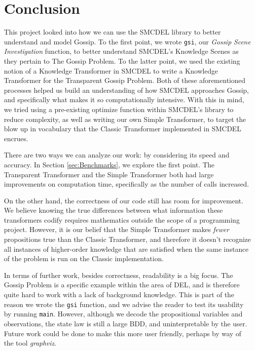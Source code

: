 
\section{Conclusion}\label{sec:Conclusion}

This project looked into how we can use the SMCDEL library to better understand and model Gossip. To the first point, we wrote \texttt{gsi}, our \textit{Gossip Scene Investigation} function, to better understand SMCDEL's Knowledge Scenes as they pertain to The Gossip Problem. To the latter point, we used the existing notion of a Knowledge Transformer in SMCDEL to write a Knowledge Transformer for the Transparent Gossip Problem. Both of these aforementioned processes helped us build an understanding of how SMCDEL approaches Gossip, and specifically what makes it so computationally intensive. With this in mind, we tried using a pre-existing optimize function within SMCDEL's library to reduce complexity, as well as writing our own Simple Transformer, to target the blow up in vocabulary that the Classic Transformer implemented in SMCDEL encrues. 

There are two ways we can analyze our work: by considering its speed and accuracy. In Section \ref{sec:Benchmarks}, we explore the first point. The Transparent Transformer and the Simple Transformer both had large improvements on computation time, specifically as the number of calls increased. 

On the other hand, the correctness of our code still has room for improvement. We believe knowing the true differences between what information these transformers codify requires mathematics outside the scope of a programming project. However, it is our belief that the Simple Transformer makes \textit{fewer} propositions true than the Classic Transformer, and therefore it doesn't recognize all instances of higher-order knowledge that are satisfied when the same instance of the problem is run on the Classic implementation. 

In terms of further work, besides correctness, readability is a big focus. The Gossip Problem is a specific example within the area of DEL, and is therefore quite hard to work with a lack of background knowledge. This is part of the reason we wrote the \texttt{gsi} function, and we advise the reader to test its usability by running \texttt{main}. However, although we decode the propositional variables and observations, the state law is still a large BDD, and uninterpretable by the user. Future work could be done to make this more user friendly, perhaps by way of the tool \textit{graphviz}. 

